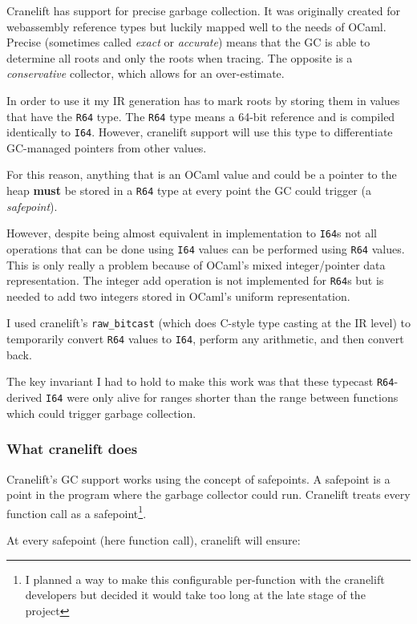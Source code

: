 Cranelift has support for precise garbage collection. It was originally created for webassembly
reference types but luckily mapped well to the needs of OCaml. Precise (sometimes called
\emph{exact} or \emph{accurate}) means that the GC is able to determine all roots and only the
roots
when tracing. The opposite is a \emph{conservative} collector, which allows for an over-estimate.

In order to use it my IR generation has to mark roots by storing them in values that have the
\texttt{R64} type. The \texttt{R64} type means a 64-bit reference and is compiled identically to
\texttt{I64}. However, cranelift support will use this type to differentiate GC-managed pointers
from other values.

For this reason, anything that is an OCaml value and could be a pointer to the heap \textbf{must}
be stored in a \texttt{R64} type at every point the GC could trigger (a \emph{safepoint}).

However, despite being almost equivalent in implementation to \texttt{I64}s not all operations that
can be done using \texttt{I64} values can be performed using \texttt{R64} values. This is only
really a
problem because of OCaml's mixed integer/pointer data representation. The integer add operation is
not
implemented for \texttt{R64}s but is needed to add two integers stored in OCaml's uniform
representation.

I used cranelift's \texttt{raw\_bitcast} (which does C-style type casting at the IR level) to
temporarily convert \texttt{R64} values to \texttt{I64}, perform any arithmetic, and then convert
back.

The key invariant I had to hold to make this work was that these typecast \texttt{R64}-derived
\texttt{I64} were only alive for ranges shorter than the range between functions which could
trigger
garbage collection.

\subsubsection{What cranelift does}

Cranelift's GC support works using the concept of safepoints. A safepoint is a point in the program
where the garbage collector could run. Cranelift treats every function call as a
safepoint\footnote{I planned a way to make this configurable per-function with the cranelift
      developers but decided it would take too long at the late stage of the project}.

At every safepoint (here function call), cranelift will ensure:


